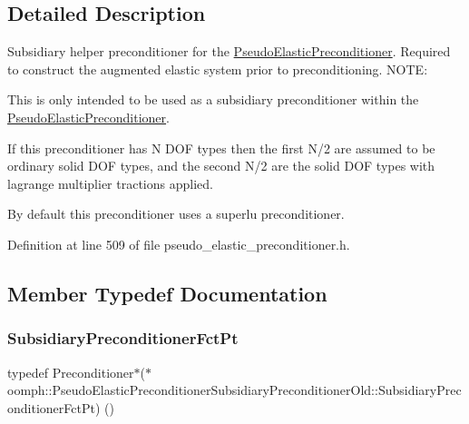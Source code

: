 \subsection{Detailed Description}
Subsidiary helper preconditioner for the \hyperlink{classoomph_1_1PseudoElasticPreconditioner}{Pseudo\+Elastic\+Preconditioner}. Required to construct the augmented elastic system prior to preconditioning. N\+O\+TE\+:
\begin{DoxyEnumerate}
\item This is only intended to be used as a subsidiary preconditioner within the \hyperlink{classoomph_1_1PseudoElasticPreconditioner}{Pseudo\+Elastic\+Preconditioner}.
\item If this preconditioner has N D\+OF types then the first N/2 are assumed to be ordinary solid D\+OF types, and the second N/2 are the solid D\+OF types with lagrange multiplier tractions applied.
\item By default this preconditioner uses a superlu preconditioner. 
\end{DoxyEnumerate}

Definition at line 509 of file pseudo\+\_\+elastic\+\_\+preconditioner.\+h.



\subsection{Member Typedef Documentation}
\mbox{\label{classoomph_1_1PseudoElasticPreconditionerSubsidiaryPreconditionerOld_a2ee5b7ddad26a4eb6662e2b701ab0a52}} 
\subsubsection{\texorpdfstring{Subsidiary\+Preconditioner\+Fct\+Pt}{SubsidiaryPreconditionerFctPt}}
{\footnotesize\ttfamily typedef Preconditioner$\ast$($\ast$ oomph\+::\+Pseudo\+Elastic\+Preconditioner\+Subsidiary\+Preconditioner\+Old\+::\+Subsidiary\+Preconditioner\+Fct\+Pt) ()}



